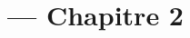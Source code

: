 
\title{\TSwiftTitle{} --- Chapitre 2}

\newcommand{\TSwiftRoot}[0]{../..} %



\maketitle

\tableofcontents




